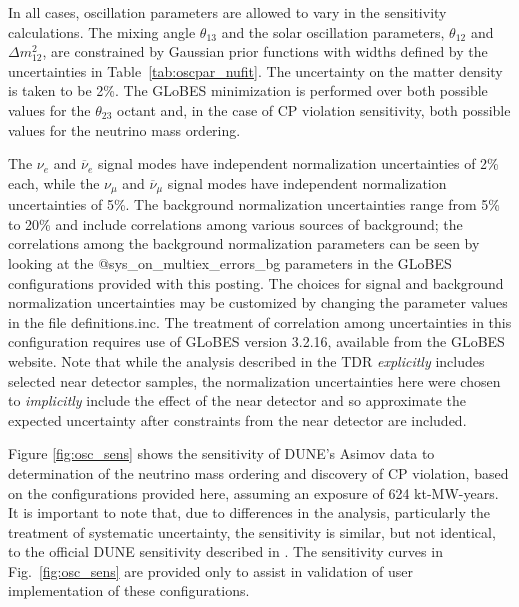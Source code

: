 \documentclass[aps,prd,superscriptaddress]{revtex4-1}
\newcommand{\nue}{\mbox{$\nu_e$}}
\newcommand{\nuebar}{\mbox{$\overline\nu_e$}}
\newcommand{\numu}{\mbox{$\nu_{\mu}$}}
\newcommand{\numubar}{\mbox{$\overline\nu_{\mu}$}}
\newcommand{\thetatwothree}{\mbox{$\theta_{23}$}}
\begin{document}
In all cases, oscillation parameters are allowed to vary in the sensitivity calculations.
The mixing angle $\theta_{13}$ and the solar oscillation parameters, $\theta_{12}$ and $\Delta m^2_{12}$,
are constrained by
Gaussian prior functions with widths defined by the uncertainties in Table~\ref{tab:oscpar_nufit}.
The uncertainty on the matter density is taken to be 2\%.
The GLoBES minimization is performed over both possible values for the $\thetatwothree$ octant and,
in the case of CP violation
sensitivity, both possible values for the neutrino mass ordering.

The $\nue$ and $\nuebar$ signal modes have independent normalization 
uncertainties of 2\% each, while the $\numu$ and $\numubar$ signal modes have independent normalization
uncertainties of 5\%.
The background normalization uncertainties range from 5\% to 20\% and
include correlations among various sources of background; the correlations among the background normalization
parameters can be seen by looking at the @sys\_on\_multiex\_errors\_bg parameters in the GLoBES configurations
provided with this posting.
The choices for signal and background normalization uncertainties
may be customized by changing the parameter values in the file definitions.inc.
The treatment of correlation among uncertainties in this configuration
requires use of GLoBES version 3.2.16, available from the GLoBES website\cite{globesweb}.
Note that while the analysis described in the TDR {\it explicitly} includes selected near detector samples,
the normalization uncertainties here were chosen to {\it implicitly} include the effect of the near
detector and so approximate the expected uncertainty after constraints from the near detector are included.

Figure \ref{fig:osc_sens} shows the sensitivity of DUNE's Asimov data to determination
of the neutrino mass ordering and discovery of CP violation, based on the configurations provided here,
assuming an exposure of 624 kt-MW-years. It is important to note that, due to differences in the analysis,
particularly the treatment
of systematic uncertainty, the sensitivity is similar, but not identical, to the official DUNE sensitivity
described in \cite{Abi:2020evt,Abi:2020qib}. The sensitivity curves in Fig.~\ref{fig:osc_sens} are provided only
to assist in validation of user implementation of these configurations.
\end{document}
